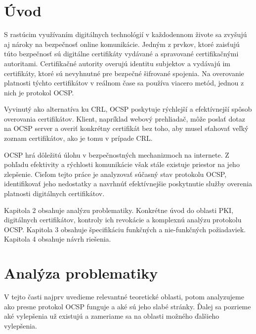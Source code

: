\documentclass[12pt, twoside]{book}
\begin{document}
\newpage\null\thispagestyle{empty}\newpage

\newpage

\pagestyle{fancy}
\setcounter{page}{1}

\fancyhf{} 
\renewcommand{\headrulewidth}{0pt}
\fancyfoot[C]{\thepage}
\renewcommand\thesection{\arabic{section}}


\section{Úvod}

S rastúcim využívaním digitálnych technológií v každodennom živote sa zvyšujú aj nároky na bezpečnosť online komunikácie. Jedným z prvkov, ktoré zaisťujú túto bezpečnosť sú digitálne certifikáty vydávané a spravované certifikačnými autoritami. Certifikačné autority overujú identitu subjektov a vydávajú im certifikáty, ktoré sú nevyhnutné pre bezpečné šifrované spojenia. Na overovanie platnosti týchto certifikátov v reálnom čase sa používa viacero metód, jednou z nich je protokol OCSP.\cite{certs2}

Vyvinutý ako alternatíva ku CRL, OCSP poskytuje rýchlejší a efektívnejší spôsob overovania certifikátov. Klient, napríklad webový prehliadač, môže poslať dotaz na OCSP server a overiť konkrétny certifikát bez toho, aby musel sťahovať veľký zoznam certifikátov, ako je tomu v prípade CRL.\cite{certs2}

OCSP hrá dôležitú úlohu v bezpečnostných mechanizmoch na internete. Z pohľadu efektivity a rýchlosti komunikácie však stále existuje priestor na jeho zlepšenie. Cieľom tejto práce je analyzovať súčasný stav protokolu OCSP, identifikovať jeho nedostatky a navrhnúť efektívnejšie poskytnutie služby overenia platnosti digitálnych certifikátov.

Kapitola 2 obsahuje analýzu problematiky. Konkrétne úvod do oblasti PKI, digitálnych certifikátov, kontroly ich revokácie a komplexnú analýzu protokolu OCSP. Kapitola 3 obsahuje špecifikáciu funkčných a nie-funkčných požiadaviek. 
Kapitola 4 obsahuje návrh riešenia.

\newpage
\section{Analýza problematiky}

V tejto časti najprv uvedieme relevantné teoretické oblasti, potom analyzujeme ako presne protokol OCSP funguje a aké sú jeho slabé stránky. Ďalej sa pozrieme aké  vylepšenia už existujú a zameriame sa na oblasti možného ďalšieho vylepšenia.
\end{document}
